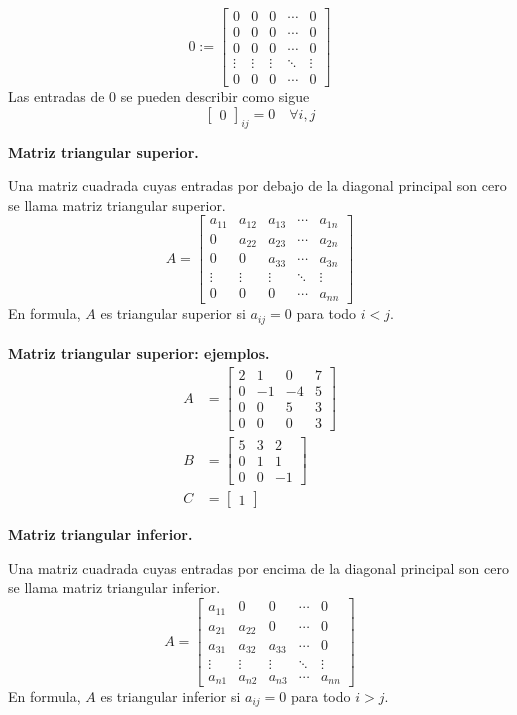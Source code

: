 \documentclass{article}
\theoremstyle{definition}
\theoremstyle{definition}
\theoremstyle{remark}
\begin{document}
\[
  0:=\begin{bmatrix} 0 & 0 & 0 & \cdots & 0 \\
    0 & 0 & 0 & \cdots & 0 \\
    0 & 0 & 0 & \cdots & 0 \\
    \vdots & \vdots & \vdots & \ddots & \vdots \\
    0 & 0 & 0 & \cdots & 0
  \end{bmatrix}
\]
Las entradas de $0$ se pueden describir como sigue \[
  \begin{bmatrix}0\end{bmatrix}_{ij}= 0 \quad \forall i,j 
\]
\pagebreak
\begin{center}
\textbf{Matriz triangular superior.}
\end{center}
Una matriz cuadrada cuyas entradas por debajo de la diagonal principal son cero se llama matriz triangular superior.\[
A=\begin{bmatrix} a_{11} & a_{12} & a_{13} & \cdots & a_{1n} \\
  0 & a_{22} & a_{23} & \cdots & a_{2n} \\
  0 & 0 & a_{33} & \cdots & a_{3n} \\
    \vdots & \vdots & \vdots & \ddots & \vdots \\
    0 & 0 & 0 & \cdots & a_{nn}
  \end{bmatrix}
\]
En formula, $A$ es triangular superior si $a_{ij}=0$ para todo $i < j$.\\\\
\textbf{Matriz triangular superior: ejemplos.}
\[
  \begin{aligned}
    A&=\begin{bmatrix}2 & 1 & 0 & 7 \\ 0 & -1 & -4 &5 \\ 0 & 0 & 5 & 3 \\ 0 & 0 & 0 & 3 \end{bmatrix} \\
    B&=\begin{bmatrix}5 & 3 & 2 \\ 0 & 1 & 1 \\ 0 & 0 & -1 \end{bmatrix} \\
    C&=\begin{bmatrix}1 \end{bmatrix}
  \end{aligned}
\]
\begin{center}
\textbf{Matriz triangular inferior.}
\end{center}
Una matriz cuadrada cuyas entradas por encima de la diagonal principal son cero se llama matriz triangular inferior. \[
A=\begin{bmatrix} a_{11} & 0 & 0 & \cdots & 0 \\
  a_{21} & a_{22} & 0 & \cdots & 0 \\
  a_{31} & a_{32} & a_{33} & \cdots & 0 \\
    \vdots & \vdots & \vdots & \ddots & \vdots \\
    a_{n1} & a_{n2} & a_{n3} & \cdots & a_{nn}
  \end{bmatrix}
\]
En formula, $A$ es triangular inferior si $a_{ij}=0$ para todo $i > j$. \pagebreak
\end{document}

